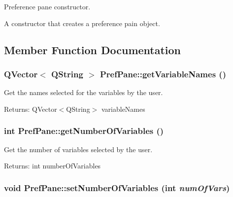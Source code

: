 Preference pane constructor. 

A constructor that creates a preference pain object. 

\subsection{Member Function Documentation}
\hypertarget{classPrefPane_f2ba42ce01d52d1da885cda71f37f2ab}{
\subsubsection[getVariableNames]{\setlength{\rightskip}{0pt plus 5cm}QVector$<$ QString $>$ PrefPane::getVariableNames ()}}
\label{classPrefPane_f2ba42ce01d52d1da885cda71f37f2ab}


Get the names selected for the variables by the user. \begin{Desc}
\item[Returns:]QVector$<$QString$>$ variableNames \end{Desc}
\hypertarget{classPrefPane_66e33d34045834467f8f4b13e723c939}{
\subsubsection[getNumberOfVariables]{\setlength{\rightskip}{0pt plus 5cm}int PrefPane::getNumberOfVariables ()}}
\label{classPrefPane_66e33d34045834467f8f4b13e723c939}


Get the number of variables selected by the user. \begin{Desc}
\item[Returns:]int numberOfVariables \end{Desc}
\hypertarget{classPrefPane_d3ba55cc80273cef6ffc494f962c37f7}{
\subsubsection[setNumberOfVariables]{\setlength{\rightskip}{0pt plus 5cm}void PrefPane::setNumberOfVariables (int {\em numOfVars})}}
\label{classPrefPane_d3ba55cc80273cef6ffc494f962c37f7}



